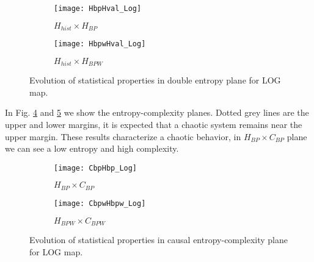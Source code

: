 \begin{figure}[H]
	\centering
	\begin{subfigure}[b]{0.49\textwidth}
		\texttt{[image: HbpHval\_Log]}
		\caption{$H_{hist} \times H_{BP}$}
		\label{fig:HbpHval_Log}
	\end{subfigure}
	\begin{subfigure}[b]{0.49\textwidth}
		\texttt{[image: HbpwHval\_Log]}
		\caption{$H_{hist} \times H_{BPW}$}
		\label{fig:HbpwHval_Log}
	\end{subfigure}
	\caption{Evolution of statistical properties in double entropy plane for LOG map.}
	\label{fig:LOG_HH}
\end{figure}

In Fig. \ref{fig:CbpHbp_Log} and \ref{fig:CbpwHbpw_Log} we show the entropy-complexity planes.
Dotted grey lines are the upper and lower margins, it is expected that a chaotic system remains near the upper margin.
These results characterize a chaotic behavior, in $H_{BP} \times C_{BP}$ plane we can see a low entropy and high complexity.

\begin{figure}[H]
	\centering
	\begin{subfigure}[b]{0.49\textwidth}
		\texttt{[image: CbpHbp\_Log]}
		\caption{$H_{BP} \times C_{BP}$}
		\label{fig:CbpHbp_Log}
	\end{subfigure}
	\begin{subfigure}[b]{0.49\textwidth}
		\texttt{[image: CbpwHbpw\_Log]}
		\caption{$H_{BPW} \times C_{BPW}$}
		\label{fig:CbpwHbpw_Log}
	\end{subfigure}
	\caption{Evolution of statistical properties in causal entropy-complexity plane for LOG map.}
	\label{fig:LOG_HC}
\end{figure}
